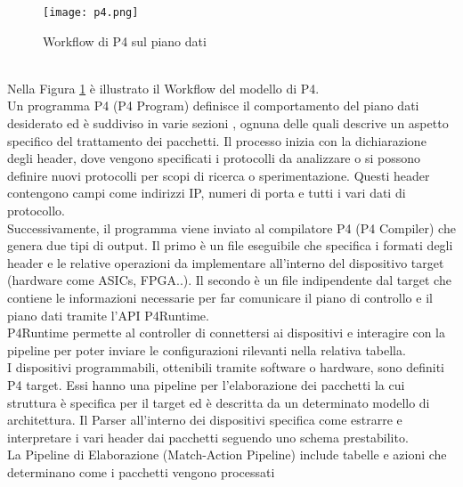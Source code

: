 \begin{figure}[h]
    \centering
   \texttt{[image: p4.png]}
    \caption{Workflow di P4 sul piano dati \cite{p4Article}}
    \label{fig:p4}
\end{figure}
\\Nella Figura \ref{fig:p4} è illustrato il Workflow del modello di P4.
\\Un programma P4 (P4 Program) definisce il comportamento del piano dati desiderato ed è suddiviso in varie sezioni \cite{p4Article}, ognuna delle quali descrive un aspetto specifico del trattamento dei pacchetti.
Il processo inizia con la dichiarazione degli header, dove vengono specificati i protocolli da analizzare o si possono definire nuovi protocolli per scopi di ricerca o sperimentazione.
Questi header contengono campi come indirizzi IP, numeri di porta e tutti i vari dati di protocollo.
\\Successivamente, il programma viene inviato al compilatore P4 (P4 Compiler) che genera due tipi di output. 
Il primo è un file eseguibile che specifica i formati degli header e le relative operazioni da implementare all'interno del dispositivo target (hardware come ASICs, FPGA..).
Il secondo è un file indipendente dal target che 
contiene le informazioni necessarie per far comunicare il piano di controllo e il piano dati tramite l'API P4Runtime.
\\P4Runtime permette al controller di connettersi ai dispositivi e interagire con la pipeline 
per poter inviare le configurazioni rilevanti nella relativa tabella. 
\\I dispositivi programmabili, ottenibili tramite software o hardware, sono definiti P4 target.
Essi hanno una pipeline per l'elaborazione dei pacchetti la cui struttura è specifica per il target ed è descritta da un determinato modello di architettura.
Il Parser all'interno dei dispositivi specifica come estrarre e interpretare i vari header dai pacchetti seguendo uno schema prestabilito.
\\La Pipeline di Elaborazione (Match-Action Pipeline) include tabelle e azioni che determinano come i pacchetti vengono processati
